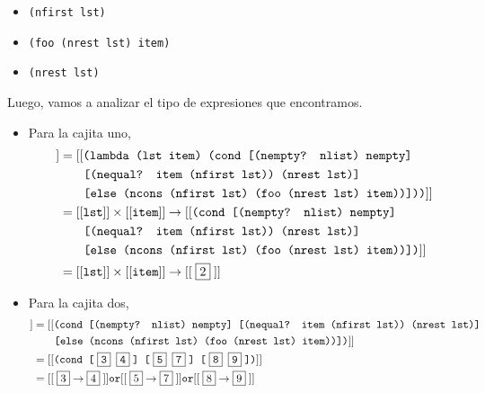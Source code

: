 \documentclass[letterpaper,11pt]{article}
\begin{document}
\begin{enumerate}
\begin{itemize}
        \item {} \texttt{(nfirst lst)}

        \item {} \texttt{(foo (nrest lst) item)}

        \item {} \texttt{(nrest lst)}
    \end{itemize}

    Luego, vamos a analizar el tipo de expresiones que encontramos.
    \begin{itemize}
        \item Para la cajita uno,
        \begin{align*}
            [[\;\fbox{1}\;]]
            &= [[\texttt{(lambda (lst item) (cond [(nempty? nlist) nempty]} \\ 
            &\; \; \; \; \; \; \; \texttt{[(nequal? item (nfirst lst)) 
            (nrest lst)]} \\
            &\; \; \; \; \; \; \; \texttt{[else (ncons (nfirst lst) 
            (foo (nrest lst) item))]))}]] \\ 
            &= [[\texttt{lst}]] \times [[\texttt{item}]] \rightarrow 
            [[\texttt{(cond [(nempty? nlist) nempty]} \\ 
            &\; \; \; \; \; \; \; \texttt{[(nequal? item (nfirst lst)) 
            (nrest lst)]} \\
            &\; \; \; \; \; \; \; \texttt{[else (ncons (nfirst lst) 
            (foo (nrest lst) item))])}]] \\ 
            &= [[\texttt{lst}]] \times [[\texttt{item}]] \rightarrow [[\;\fbox{2}\;]]
        \end{align*}
   
        \item Para la cajita dos, 
        \begin{align*}
            [[\;\fbox{2}\;]] 
            &= [[\texttt{(cond [(nempty? nlist) nempty] [(nequal? item 
            (nfirst lst)) (nrest lst)]} \\ 
            &\; \; \; \; \; \; \; \texttt{[else (ncons (nfirst lst) 
            (foo (nrest lst) item))])}]] \\ 
            &= [[\texttt{(cond [\;\fbox{3} \fbox{4}\;] [\;\fbox{5} \fbox{7}\;] 
            [\;\fbox{8} \fbox{9}\;])}]] \\
            &= [[\;\fbox{3} \rightarrow \fbox{4}\;]] \texttt{or} 
            [[\;\fbox{5} \rightarrow \fbox{7}\;]] \texttt{or}
            [[\;\fbox{8} \rightarrow \fbox{9}\;]]
        \end{align*}


\end{itemize}
\end{enumerate}
\end{document}

